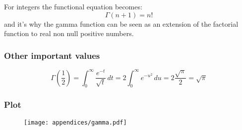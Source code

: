For integers the functional equation becomes:
\[
    \Gamma(n + 1) = n!
\]
and it’s why the gamma function can be seen as an extension of the factorial function to real non null positive numbers.

\subsubsection{Other important values}

\[
    \Gamma\left(\frac{1}{2}\right) = \int_0^\infty \frac{e^{-t}}{\sqrt{t}} \, dt = 2\int_0^\infty e^{-u^2} \, du = 2 \frac{\sqrt{\pi}}{2} = \sqrt{\pi}
\]

\subsubsection{Plot}

\begin{figure}[H]
    \centering
	\texttt{[image: appendices/gamma.pdf]}
\end{figure}
